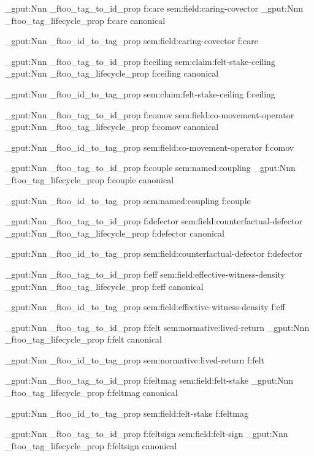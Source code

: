 \prop_gput:Nnn \g_ftoo_tag_to_id_prop { f:care } { sem:field:caring-covector }
\prop_gput:Nnn \g_ftoo_tag_lifecycle_prop { f:care } { canonical }

\prop_gput:Nnn \g_ftoo_id_to_tag_prop { sem:field:caring-covector } { f:care }


\prop_gput:Nnn \g_ftoo_tag_to_id_prop { f:ceiling } { sem:claim:felt-stake-ceiling }
\prop_gput:Nnn \g_ftoo_tag_lifecycle_prop { f:ceiling } { canonical }

\prop_gput:Nnn \g_ftoo_id_to_tag_prop { sem:claim:felt-stake-ceiling } { f:ceiling }


\prop_gput:Nnn \g_ftoo_tag_to_id_prop { f:comov } { sem:field:co-movement-operator }
\prop_gput:Nnn \g_ftoo_tag_lifecycle_prop { f:comov } { canonical }

\prop_gput:Nnn \g_ftoo_id_to_tag_prop { sem:field:co-movement-operator } { f:comov }


\prop_gput:Nnn \g_ftoo_tag_to_id_prop { f:couple } { sem:named:coupling }
\prop_gput:Nnn \g_ftoo_tag_lifecycle_prop { f:couple } { canonical }

\prop_gput:Nnn \g_ftoo_id_to_tag_prop { sem:named:coupling } { f:couple }


\prop_gput:Nnn \g_ftoo_tag_to_id_prop { f:defector } { sem:field:counterfactual-defector }
\prop_gput:Nnn \g_ftoo_tag_lifecycle_prop { f:defector } { canonical }

\prop_gput:Nnn \g_ftoo_id_to_tag_prop { sem:field:counterfactual-defector } { f:defector }


\prop_gput:Nnn \g_ftoo_tag_to_id_prop { f:eff } { sem:field:effective-witness-density }
\prop_gput:Nnn \g_ftoo_tag_lifecycle_prop { f:eff } { canonical }

\prop_gput:Nnn \g_ftoo_id_to_tag_prop { sem:field:effective-witness-density } { f:eff }


\prop_gput:Nnn \g_ftoo_tag_to_id_prop { f:felt } { sem:normative:lived-return }
\prop_gput:Nnn \g_ftoo_tag_lifecycle_prop { f:felt } { canonical }

\prop_gput:Nnn \g_ftoo_id_to_tag_prop { sem:normative:lived-return } { f:felt }


\prop_gput:Nnn \g_ftoo_tag_to_id_prop { f:feltmag } { sem:field:felt-stake }
\prop_gput:Nnn \g_ftoo_tag_lifecycle_prop { f:feltmag } { canonical }

\prop_gput:Nnn \g_ftoo_id_to_tag_prop { sem:field:felt-stake } { f:feltmag }


\prop_gput:Nnn \g_ftoo_tag_to_id_prop { f:feltsign } { sem:field:felt-sign }
\prop_gput:Nnn \g_ftoo_tag_lifecycle_prop { f:feltsign } { canonical }

